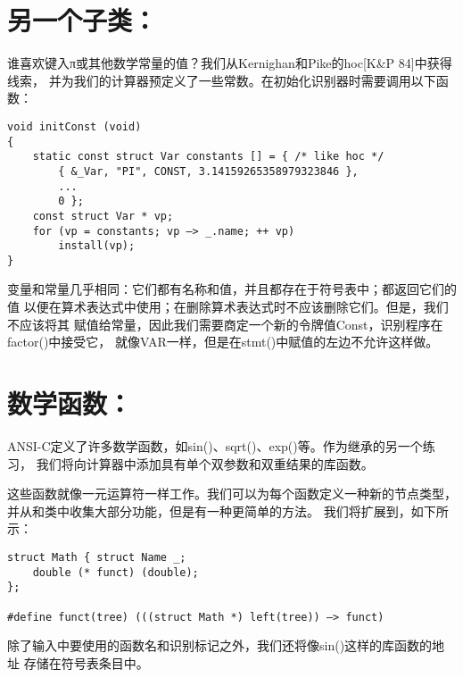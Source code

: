 \section{另一个子类：}

    谁喜欢键入π或其他数学常量的值？我们从Kernighan和Pike的hoc[K&P 84]中获得线索，
并为我们的计算器预定义了一些常数。在初始化识别器时需要调用以下函数：

\begin{lstlisting}
void initConst (void) 
{
    static const struct Var constants [] = { /* like hoc */ 
        { &_Var, "PI", CONST, 3.14159265358979323846 }, 
        ... 
        0 }; 
    const struct Var * vp;
    for (vp = constants; vp —> _.name; ++ vp)
        install(vp);
} 
\end{lstlisting}

    变量和常量几乎相同：它们都有名称和值，并且都存在于符号表中；都返回它们的值
以便在算术表达式中使用；在删除算术表达式时不应该删除它们。但是，我们不应该将其
赋值给常量，因此我们需要商定一个新的令牌值Const，识别程序在factor()中接受它，
就像VAR一样，但是在stmt()中赋值的左边不允许这样做。

\section{数学函数：}
    ANSI-C定义了许多数学函数，如sin()、sqrt()、exp()等。作为继承的另一个练习，
我们将向计算器中添加具有单个双参数和双重结果的库函数。

    这些函数就像一元运算符一样工作。我们可以为每个函数定义一种新的节点类型，
并从和类中收集大部分功能，但是有一种更简单的方法。
我们将扩展到，如下所示：

\begin{lstlisting}
struct Math { struct Name _; 
    double (* funct) (double); 
}; 

#define funct(tree) (((struct Math *) left(tree)) —> funct)
\end{lstlisting}

    除了输入中要使用的函数名和识别标记之外，我们还将像sin()这样的库函数的地址
存储在符号表条目中。

